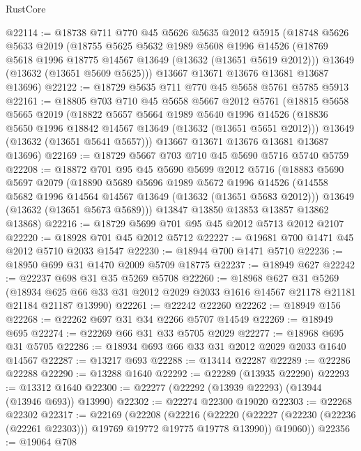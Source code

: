 \begin{lexlean}{RustCore}
\begin{coremodule}
@22114 := @18738
    @711
    @770
    @45
    @5626
    @5635
    @2012
    @5915
    (@18748
      @5626
      @5633
      @2019
      (@18755
        @5625
        @5632
        @1989
        @5608
        @1996
        @14526
        (@18769 @5618 @1996 @18775 @14567 @13649 (@13632 (@13651 @5619 @2012)))
        @13649
        (@13632 (@13651 @5609 @5625)))
      @13667
      @13671
      @13676
      @13681
      @13687
      @13696)
@22122 := @18729 @5635 @711 @770 @45 @5658 @5761 @5785 @5913
@22161 := @18805
    @703
    @710
    @45
    @5658
    @5667
    @2012
    @5761
    (@18815
      @5658
      @5665
      @2019
      (@18822
        @5657
        @5664
        @1989
        @5640
        @1996
        @14526
        (@18836 @5650 @1996 @18842 @14567 @13649 (@13632 (@13651 @5651 @2012)))
        @13649
        (@13632 (@13651 @5641 @5657)))
      @13667
      @13671
      @13676
      @13681
      @13687
      @13696)
@22169 := @18729 @5667 @703 @710 @45 @5690 @5716 @5740 @5759
@22208 := @18872
    @701
    @95
    @45
    @5690
    @5699
    @2012
    @5716
    (@18883
      @5690
      @5697
      @2079
      (@18890
        @5689
        @5696
        @1989
        @5672
        @1996
        @14526
        (@14558 @5682 @1996 @14564 @14567 @13649 (@13632 (@13651 @5683 @2012)))
        @13649
        (@13632 (@13651 @5673 @5689)))
      @13847
      @13850
      @13853
      @13857
      @13862
      @13868)
@22216 := @18729 @5699 @701 @95 @45 @2012 @5713 @2012 @2107
@22220 := @18928 @701 @45 @2012 @5712
@22227 := @19681 @700 @1471 @45 @2012 @5710 @2033 @1547
@22230 := @18944 @700 @1471 @5710
@22236 := @18950 @699 @31 @1470 @2009 @5709 @18775
@22237 := @18949 @627
@22242 := @22237 @698 @31 @35 @5269 @5708
@22260 := @18968
    @627
    @31
    @5269
    (@18934 @625 @66 @33 @31 @2012 @2029 @2033 @1616 @14567 @21178 @21181 @21184 @21187 @13990)
@22261 := @22242 @22260
@22262 := @18949 @156
@22268 := @22262 @697 @31 @34 @2266 @5707 @14549
@22269 := @18949 @695
@22274 := @22269 @66 @31 @33 @5705 @2029
@22277 := @18968 @695 @31 @5705
@22286 := @18934 @693 @66 @33 @31 @2012 @2029 @2033 @1640 @14567
@22287 := @13217 @693
@22288 := @13414 @22287
@22289 := @22286 @22288
@22290 := @13288 @1640
@22292 := @22289 (@13935 @22290)
@22293 := @13312 @1640
@22300 := @22277 (@22292 (@13939 @22293) (@13944 (@13946 @693)) @13990)
@22302 := @22274 @22300 @19020
@22303 := @22268 @22302
@22317 := @22169
    (@22208
      (@22216
        (@22220 (@22227 (@22230 (@22236 (@22261 @22303))) @19769 @19772 @19775 @19778 @13990))
        @19060))
@22356 := @19064
    @708

\end{coremodule}
\end{lexlean}
